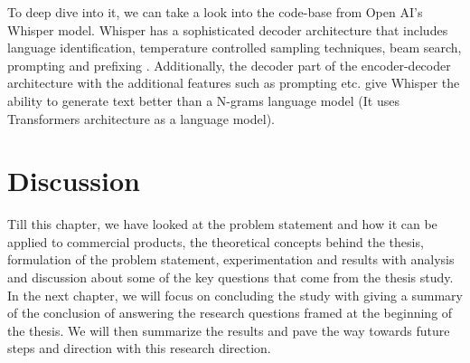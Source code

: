To deep dive into it, we can take a look into the code-base from Open AI's Whisper model. Whisper has a sophisticated decoder architecture that includes language identification, temperature controlled sampling techniques, beam search, prompting and prefixing \cite{radford2023robust}. Additionally, the decoder part of the encoder-decoder architecture with the additional features such as prompting etc. give Whisper the ability to generate text better than a N-grams language model (It uses Transformers architecture as a language model).

\section{Discussion}

Till this chapter, we have looked at the problem statement and how it can be applied to commercial products, the theoretical concepts behind the thesis, formulation of the problem statement, experimentation and results with analysis and discussion about some of the key questions that come from the thesis study. In the next chapter, we will focus on concluding the study with giving a summary of the conclusion of answering the research questions framed at the beginning of the thesis. We will then summarize the results and pave the way towards future steps and direction with this research direction.